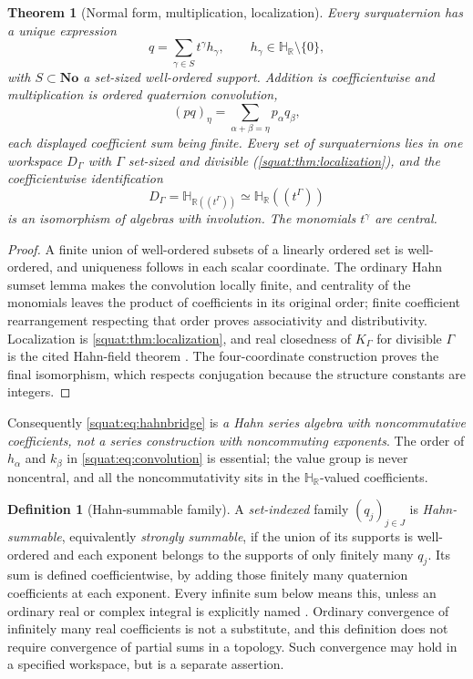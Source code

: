\documentclass[11pt,letterpaper]{article}
\numberwithin{equation}{section}
\newtheorem{theorem}{Theorem}[section]
\theoremstyle{definition}
\newtheorem{definition}[definition]{Definition}
\theoremstyle{remark}
\newcommand{\No}{\mathbf{No}}
\newcommand{\HR}{\mathbb H_{\mathbb R}}
\newcommand{\R}{\mathbb R}
\begin{document}
\begin{theorem}[Normal form, multiplication, localization]\label{squat:thm:normal}
Every surquaternion has a unique expression
\begin{equation}\label{squat:eq:qnormal}
 q=\sum_{\gamma\in S}t^\gamma h_\gamma,\qquad h_\gamma\in\HR\setminus\{0\},
\end{equation}
with $S\subset\No$ a set-sized well-ordered support. Addition is coefficientwise and
multiplication is \emph{ordered} quaternion convolution,
\begin{equation}\label{squat:eq:convolution}
 (pq)_\eta=\sum_{\alpha+\beta=\eta}p_\alpha q_\beta ,
\end{equation}
each displayed coefficient sum being finite. Every set of surquaternions lies in one
workspace $D_\Gamma$ with $\Gamma$ set-sized and divisible
(\cref{squat:thm:localization}), and the coefficientwise identification
\begin{equation}\label{squat:eq:hahnbridge}
 D_\Gamma=\mathbb H_{\R((t^\Gamma))}\simeq\HR((t^\Gamma))
\end{equation}
is an isomorphism of algebras with involution. The monomials $t^\gamma$ are
\emph{central}.
\end{theorem}
\begin{proof}
A finite union of well-ordered subsets of a linearly ordered set is well-ordered, and
uniqueness follows in each scalar coordinate. The ordinary Hahn sumset lemma makes the
convolution locally finite, and centrality of the monomials leaves the product of
coefficients in its original order; finite coefficient rearrangement respecting that
order proves associativity and distributivity. Localization is
\cref{squat:thm:localization}, and real closedness of $K_\Gamma$ for divisible $\Gamma$ is
the cited Hahn-field theorem \cite{Alling,EK}. The four-coordinate construction proves the
final isomorphism, which respects conjugation because the structure constants are
integers.
\end{proof}

Consequently \cref{squat:eq:hahnbridge} is \emph{a Hahn series algebra with
noncommutative coefficients, not a series construction with noncommuting exponents}. The
order of $h_\alpha$ and $k_\beta$ in \cref{squat:eq:convolution} is essential; the value
group is never noncentral, and all the noncommutativity sits in the $\HR$-valued
coefficients.

\begin{definition}[Hahn-summable family]\label{squat:def:summable}
A \emph{set-indexed} family $(q_j)_{j\in J}$ is \emph{Hahn-summable}, equivalently
\emph{strongly summable}, if the union of its supports is well-ordered and each exponent
belongs to the supports of only finitely many $q_j$. Its sum is defined coefficientwise,
by adding those finitely many quaternion coefficients at each exponent. Every infinite
sum below means this, unless an ordinary real or complex integral is explicitly named
\cite{BM}. Ordinary convergence of infinitely many real coefficients is not a substitute,
and this definition does not require convergence of partial sums in a topology. Such
convergence may hold in a specified workspace, but is a separate assertion.
\end{definition}
\end{document}
